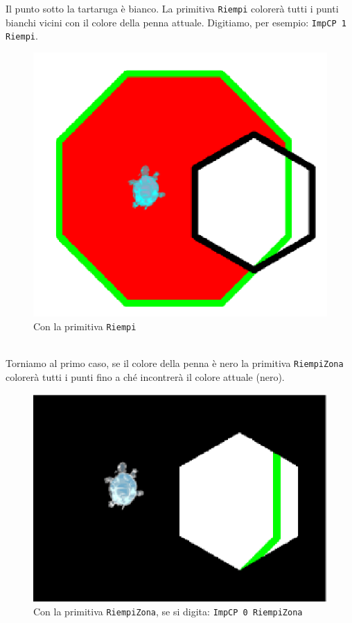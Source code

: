 Il punto sotto la tartaruga è bianco. La primitiva \texttt{Riempi} colorerà tutti i punti bianchi vicini con il colore della penna attuale. Digitiamo, per esempio: \texttt{ImpCP 1 Riempi}.
\begin{figure}[h]
	\begin{center}
		\includegraphics*[scale=0.2]{pics/remplis1.png}
	\end{center}
	\caption {Con la primitiva \texttt{Riempi}}
\end{figure}
\noindent
\\
Torniamo al primo caso, se il colore della penna è nero la primitiva \texttt{RiempiZona} colorerà tutti i punti fino a ché incontrerà il colore attuale (nero).
\begin{figure}[h]
	\begin{center}
		\includegraphics*[scale=0.2]{pics/remplis2.png}
	\end{center}
	\caption {Con la primitiva \texttt{RiempiZona}, se si digita: \texttt{ImpCP 0 RiempiZona} }
\end{figure}

